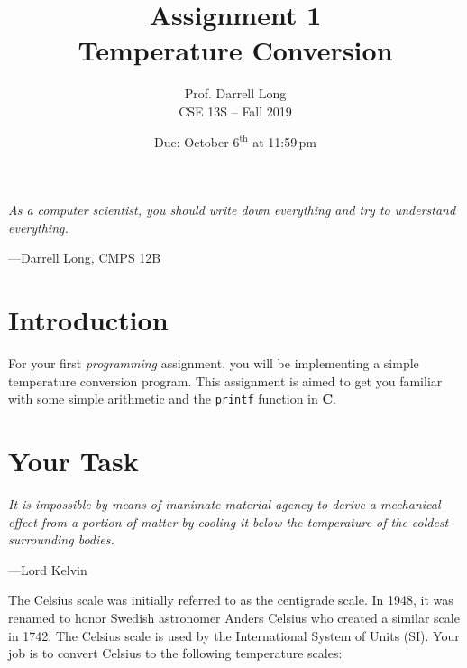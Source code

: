 \documentclass{article}
\title{Assignment 1 \\ Temperature Conversion}
\author{Prof. Darrell Long \\
CSE 13S -- Fall 2019}
\date{Due: October 6$^\text{th}$ at 11:59\,pm}
\begin{document}
\maketitle
{}\textwidth
\epigraph{
\emph{As a computer scientist, you should write down everything and try to understand everything.}}{---Darrell Long, CMPS 12B}


\section{Introduction}

For your first \emph{programming} assignment, you will be implementing
a simple temperature conversion program. This assignment is aimed
to get you familiar with some simple arithmetic and the \texttt{printf}
function in \textbf{C}.


\section{Your Task}
\epigraph{
\emph{It is impossible by means of inanimate material agency to derive a mechanical effect from a portion of matter by cooling it below the temperature of the coldest surrounding bodies.}}{---Lord Kelvin}

\noindent The Celsius scale was initially referred to as the
centigrade scale. In 1948, it was renamed to honor Swedish astronomer
Anders Celsius who created a similar scale in 1742. The Celsius
scale is used by the International System of Units (SI). Your job
is to convert Celsius to the following temperature scales:
\end{document}
